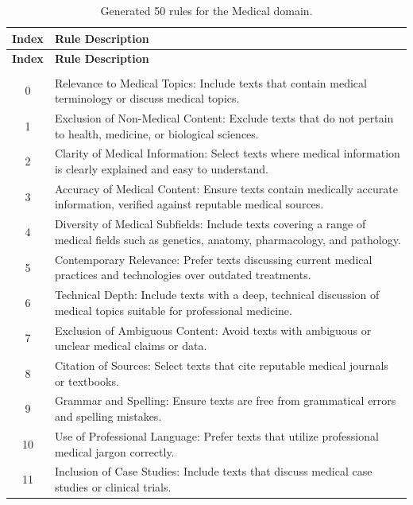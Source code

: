 \documentclass{article}
\newcommand{\mytiny}{\fontsize{8pt}{10pt}\selectfont}
\begin{document}
\begingroup
\mytiny
\begin{longtable}{c|p{14cm}} %
\hline
\textbf{Index} & \textbf{Rule Description} \\
\hline
\endfirsthead

\hline
\textbf{Index} & \textbf{Rule Description} \\
\hline
\endhead

\hline
\endfoot

\caption{Generated 50 rules for the Medical domain.} \label{tab:rules_for_medical} \\
\endlastfoot

0  & Relevance to Medical Topics: Include texts that contain medical terminology or discuss medical topics. \\
\hline
1  & Exclusion of Non-Medical Content: Exclude texts that do not pertain to health, medicine, or biological sciences. \\
\hline
2  & Clarity of Medical Information: Select texts where medical information is clearly explained and easy to understand. \\
\hline
3  & Accuracy of Medical Content: Ensure texts contain medically accurate information, verified against reputable medical sources. \\
\hline
4  & Diversity of Medical Subfields: Include texts covering a range of medical fields such as genetics, anatomy, pharmacology, and pathology. \\
\hline
5  & Contemporary Relevance: Prefer texts discussing current medical practices and technologies over outdated treatments. \\
\hline
6  & Technical Depth: Include texts with a deep, technical discussion of medical topics suitable for professional medicine. \\
\hline
7  & Exclusion of Ambiguous Content: Avoid texts with ambiguous or unclear medical claims or data. \\
\hline
8  & Citation of Sources: Select texts that cite reputable medical journals or textbooks. \\
\hline
9  & Grammar and Spelling: Ensure texts are free from grammatical errors and spelling mistakes. \\
\hline
10 & Use of Professional Language: Prefer texts that utilize professional medical jargon correctly. \\
\hline
11 & Inclusion of Case Studies: Include texts that discuss medical case studies or clinical trials. \\
\hline

\end{longtable}
\end{document}
